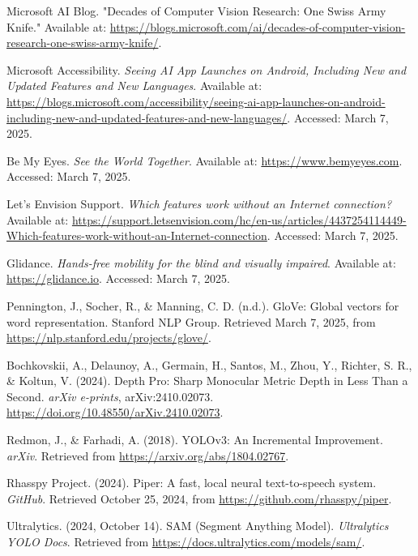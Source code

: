 \documentclass[12pt,a4paper]{article}
\begin{document}
\newpage
\begin{thebibliography}{9}
    
    Microsoft AI Blog. 
    "Decades of Computer Vision Research: One Swiss Army Knife."  
    Available at:  
    \url{https://blogs.microsoft.com/ai/decades-of-computer-vision-research-one-swiss-army-knife/}.
    
    Microsoft Accessibility.  
    \textit{Seeing AI App Launches on Android, Including New and Updated Features and New Languages}.  
    Available at: \url{https://blogs.microsoft.com/accessibility/seeing-ai-app-launches-on-android-including-new-and-updated-features-and-new-languages/}.  
    Accessed: March 7, 2025.

    Be My Eyes.  
    \textit{See the World Together}.  
    Available at: \url{https://www.bemyeyes.com}. Accessed: March 7, 2025.

    Let's Envision Support.  
    \textit{Which features work without an Internet connection?}  
    Available at: \url{https://support.letsenvision.com/hc/en-us/articles/4437254114449-Which-features-work-without-an-Internet-connection}.  
    Accessed: March 7, 2025.

    Glidance.  
    \textit{Hands-free mobility for the blind and visually impaired}.  
    Available at: \url{https://glidance.io}.  
    Accessed: March 7, 2025.

     Pennington, J., Socher, R., \& Manning, C. D. (n.d.). GloVe: Global vectors for word representation. Stanford NLP Group. Retrieved March 7, 2025, from \url{https://nlp.stanford.edu/projects/glove/}.

     Bochkovskii, A., Delaunoy, A., Germain, H., Santos, M., Zhou, Y., Richter, S. R., \& Koltun, V. (2024). Depth Pro: Sharp Monocular Metric Depth in Less Than a Second. \textit{arXiv e-prints}, arXiv:2410.02073. \url{https://doi.org/10.48550/arXiv.2410.02073}.

     Redmon, J., \& Farhadi, A. (2018). YOLOv3: An Incremental Improvement. \textit{arXiv}. Retrieved from \url{https://arxiv.org/abs/1804.02767}.

     Rhasspy Project. (2024). Piper: A fast, local neural text-to-speech system. \textit{GitHub}. Retrieved October 25, 2024, from \url{https://github.com/rhasspy/piper}.

     Ultralytics. (2024, October 14). SAM (Segment Anything Model). \textit{Ultralytics YOLO Docs}. Retrieved from \url{https://docs.ultralytics.com/models/sam/}.

    \end{thebibliography}
    
\end{document}
